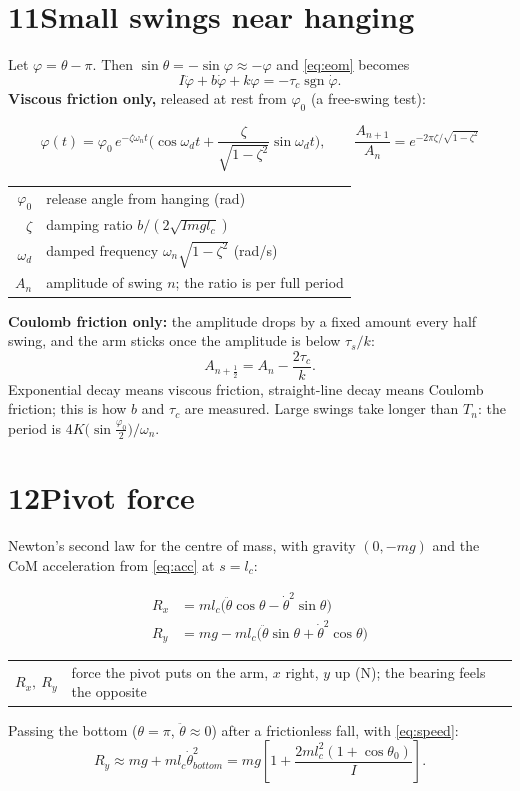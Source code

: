 \documentclass[11pt]{article}
\makeatletter
\newcommand{\sgn}{\operatorname{sgn}}
\newcommand{\where}[1]{\par\vspace{-2pt}{\small\color{muted}\textit{where}}\par\vspace{-2pt}
  {\small\renewcommand{\arraystretch}{1.08}\begin{tabular}{@{}>{$}r<{$}@{\;\;}l@{}}#1\end{tabular}}}
\makeatother
\begin{document}
\section*{11\quad Small swings near hanging}
Let $\varphi=\theta-\pi$. Then $\sin\theta=-\sin\varphi\approx-\varphi$ and \eqref{eq:eom} becomes
\begin{equation}
I\ddot\varphi+b\dot\varphi+k\varphi=-\tau_c\sgn\dot\varphi .
\end{equation}
\textbf{Viscous friction only,} released at rest from $\varphi_0$ (a free-swing test):
\begin{result}
\begin{equation}
\varphi(t)=\varphi_0\,e^{-\zeta\omega_nt}\Big(\cos\omega_dt+\frac{\zeta}{\sqrt{1-\zeta^2}}\sin\omega_dt\Big),\qquad
\frac{A_{n+1}}{A_n}=e^{-2\pi\zeta/\sqrt{1-\zeta^2}}
\end{equation}
\where{\varphi_0 & release angle from hanging (rad)\\ \zeta & damping ratio $b/(2\sqrt{I m g l_c})$\\ \omega_d & damped frequency $\omega_n\sqrt{1-\zeta^2}$ (rad/s)\\ A_n & amplitude of swing $n$; the ratio is per full period}
\end{result}
\textbf{Coulomb friction only:} the amplitude drops by a fixed amount every half swing, and the arm sticks once the amplitude is below $\tau_s/k$:
\begin{equation}
A_{n+\frac12}=A_n-\frac{2\tau_c}{k}.
\end{equation}
Exponential decay means viscous friction, straight-line decay means Coulomb friction; this is how $b$ and $\tau_c$ are measured. Large swings take longer than $T_n$: the period is $4K\!\big(\sin\frac{\varphi_0}{2}\big)/\omega_n$.

\section*{12\quad Pivot force}
Newton's second law for the centre of mass, with gravity $(0,-mg)$ and the CoM acceleration from \eqref{eq:acc} at $s=l_c$:
\begin{result}
\begin{align}
R_x &= m l_c\big(\ddot\theta\cos\theta-\dot\theta^2\sin\theta\big)\\
R_y &= m g - m l_c\big(\ddot\theta\sin\theta+\dot\theta^2\cos\theta\big)
\end{align}
\where{R_x,\ R_y & force the pivot puts on the arm, $x$ right, $y$ up (N); the bearing feels the opposite}
\end{result}
Passing the bottom ($\theta=\pi$, $\ddot\theta\approx0$) after a frictionless fall, with \eqref{eq:speed}:
\begin{equation}
R_y\approx m g+m l_c\dot\theta_{bottom}^2=m g\left[1+\frac{2 m l_c^2(1+\cos\theta_0)}{I}\right].
\end{equation}
\end{document}

